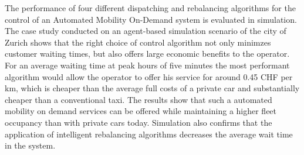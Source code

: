 The performance of four different dispatching and rebalancing algorithms for the
control of an Automated Mobility On-Demand system is evaluated in simulation.
The case study conducted on an agent-based simulation scenario of the city of Zurich
shows that the right choice of control algorithm not only minimzes customer waiting
times, but also offers large economic benefits to the operator. For an average
waiting time at peak hours of five minutes the most performant algorithm would allow
the operator to offer his service for around 0.45 CHF per km, which is cheaper than
the average full costs of a private car and substantially cheaper than a conventional
taxi. The results show that such a automated mobility on demand services can be offered
while maintaining a higher fleet occupancy than with private cars today. Simulation
also confirms that the application of intelligent rebalancing algorithms decreases
the average wait time in the system.
